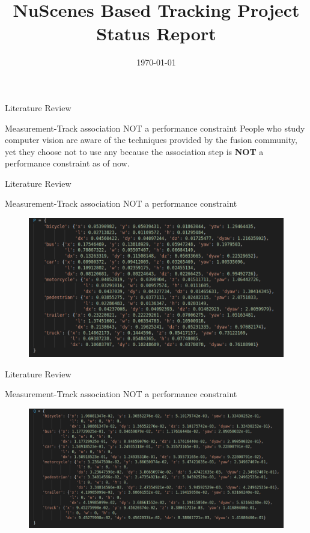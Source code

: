\documentclass[aspectratio=169,xcolor=dvipsnames]{beamer}
\title{NuScenes Based Tracking Project Status Report} %
\date{\today} %
\begin{document}
\begin{frame}
    \titlepage
\end{frame}

\begin{frame}{Literature Review}
\begin{block}{Measurement-Track association NOT a performance constraint}
    People who study computer vision are aware of the techniques provided by the fusion community, yet they choose not to use any because the association step is \textbf{NOT} 
    a performance constraint as of now.
\end{block}
\end{frame}

\begin{frame}{Literature Review}
\begin{block}{Measurement-Track association NOT a performance constraint}
    \begin{figure}
    \includegraphics[width=0.9\linewidth]{DA/2.png}
    \end{figure}
\end{block}
\end{frame}

\begin{frame}{Literature Review}
\begin{block}{Measurement-Track association NOT a performance constraint}
    \begin{figure}
    \includegraphics[width=0.9\linewidth]{DA/3.png}
    \end{figure}
\end{block}
\end{frame}
\end{document}
